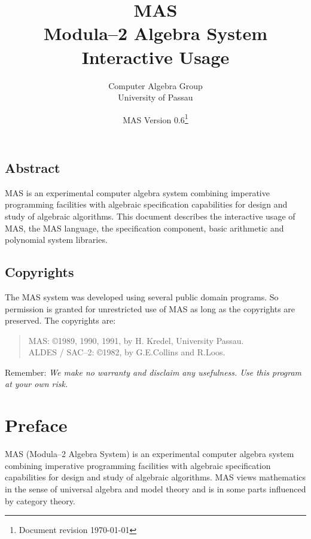 
\title{MAS \\ Modula--2 Algebra System\\
       {Interactive Usage}}

\author{%
        Computer Algebra Group \\
        University of Passau 
        }

\date{MAS Version 0.6\footnote{Document revision \today}
      }


\maketitle

\section*{Abstract}

MAS is an experimental computer algebra system
combining imperative programming facilities with 
algebraic specification capabilities 
for design and study of algebraic algorithms.   
This document describes the interactive usage of MAS, 
the MAS language, the specification component, 
basic arithmetic and polynomial system libraries.

\vfill

\section*{Copyrights}

The MAS system was developed using several 
public domain programs. 
So permission is granted for unrestricted use of MAS 
as long as the copyrights are preserved.
The copyrights are:
\begin{quote}
MAS: \copyright 1989, 1990, 1991, by H. Kredel, University Passau. \\
ALDES / SAC--2: \copyright 1982, by G.E.Collins and R.Loos.
\end{quote}
Remember:
{\em 
We make no warranty and disclaim any usefulness. 
Use this program at your own risk. 
}


\chapter*{Preface}

MAS (Modula--2 Algebra System) is an 
experimental computer algebra system
combining imperative programming facilities with 
algebraic specification capabilities 
for design and study of algebraic algorithms.   
MAS views mathematics in the 
sense of universal algebra and model theory and is 
in some parts influenced by category theory.

